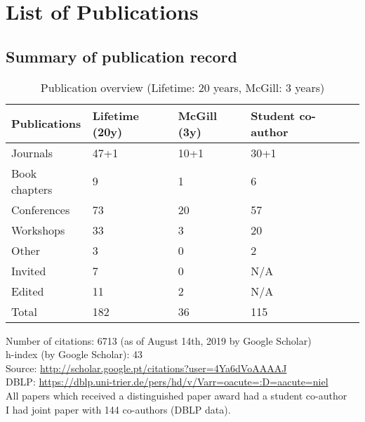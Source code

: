 \section{List of Publications}
\label{sec:publication-list}


\subsection{Summary of publication record}

\begin{table}[htb]
\begin{tabular}{@{}lllll@{}}
\toprule
\textbf{Publications} & \textbf{Lifetime} (20y) & \textbf{McGill} (3y) & \textbf{Student co-author} \\ \midrule
Journals & 47+1 & 10+1 & 30+1 \\ %
Book chapters & 9 & 1 & 6  \\ %
Conferences & 73 & 20 & 57  \\ %
Workshops & 33 & 3 & 20  \\ %
Other & 3 & 0 & 2  \\ %
Invited & 7 & 0 & N/A   \\ %
Edited & 11 & 2 & N/A \\ \midrule
Total & 182 & 36 & 115 \\ %
\bottomrule
\end{tabular}
\caption{Publication overview (Lifetime: 20 years, McGill: 3 years)}
\label{tab:publication-overview}
\end{table}


Number of citations: 6713 (as of August 14th, 2019 by Google Scholar) \\
h-index (by Google Scholar): 43 \\
Source: \url{http://scholar.google.pt/citations?user=4Ya6dVoAAAAJ}  \\
DBLP: \url{https://dblp.uni-trier.de/pers/hd/v/Varr=oacute=:D=aacute=niel}  \\
All papers which received a distinguished paper award had a student co-author \\
I had joint paper with 144 co-authors (DBLP data). \\

